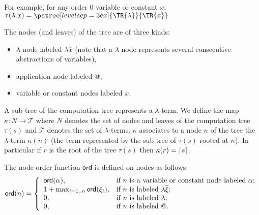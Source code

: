 For example, for any order $0$ variable or constant $x$: $
\cmptre{\lambda . x} =  \pstree[levelsep=3ex]
    { \TR{\lambda } }
    { \TR{x}
    }$

The nodes (and leaves) of the tree are of three kinds:
\begin{itemize}
\item $\lambda$-node labeled $\lambda \overline{x}$ (note that a $\lambda$-node represents several consecutive abstractions of
variables),
\item application node labeled $@$,
\item variable or constant nodes labeled $x$.
\end{itemize}

A sub-tree of the computation tree represents a $\lambda$-term. We
define the map $\kappa : N \rightarrow \mathcal{T}$ where $N$
denotes the set of nodes and leaves of the computation tree
$\tau(s)$ and $\mathcal{T}$ denotes the set of $\lambda$-terms.
$\kappa$ associates to a node $n$ of the tree the $\lambda$-term
$\kappa(n)$ (the term represented by the sub-tree of $\tau(s)$
rooted at $n$). In particular if $r$ is the root of the tree
$\tau(s)$ then $\kappa(r) = \lceil s\rceil$.

\begin{dfn}

 The node-order function $\textsf{ord}$
is defined on nodes as follows:
\begin{eqnarray*}
{\sf ord}(n) = \left\{
  \begin{array}{ll}
    {\sf ord}(\alpha), & \hbox{if $n$ is a variable or constant node labeled $\alpha $;} \\
    1 + \max_{i=1..n} {\sf ord}(\xi_i), & \hbox{if $n$ is labeled $\lambda \overline{\xi}$;} \\
    0, & \hbox{if $n$ is labeled $\lambda$;} \\
    0, & \hbox{if $n$ is labeled $@$.}
  \end{array}
\right.
\end{eqnarray*}
\end{dfn}


